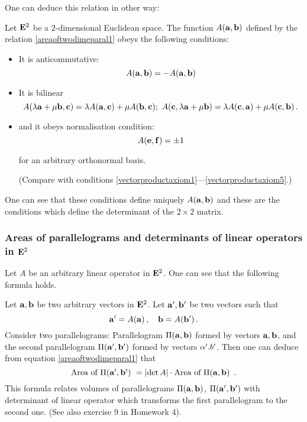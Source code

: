 \documentclass[12pt]{article}
\numberwithin{equation}{section}
\begin{document}
{\footnotesize One can deduce this relation in other way:

  Let ${\bf E}^2$ be a $2$-dimensional Euclidean space. The function $A({\bf a},{\bf b})$
  defined by the relation  \eqref{areaoftwodimeparal1} obeys the following conditions:

 \begin{itemize}

\item
   It is anticommutative:
 \begin{equation}\label{condit1}
   A({\bf a},{\bf b})=-A({\bf a},{\bf b})
\end{equation}

\item It is bilinear
  \begin{equation}\label{condit2}
A(\lambda{\bf a}+\mu {\bf b},{\bf c})=\lambda A({\bf a},{\bf c})+\mu A({\bf b},{\bf c}); \,\,
A({\bf c},\lambda{\bf a}+\mu {\bf b})=\lambda A({\bf c},{\bf a})+\mu A({\bf c},{\bf b})\,.
\end{equation}
\item and it obeys normalisation condition:
    \begin{equation}\label{condit3}
   A({\bf e},{\bf f})=\pm 1
\end{equation}

for an arbitrary orthonormal basis.



(Compare with conditions \eqref{vectorproductaxiom1}---\eqref{vectorproductaxiom5}.)

  \end{itemize}
One can see that these conditions define uniquely
$A({\bf a},{\bf b})$ and these are the conditions which define the determinant of the $2\times 2$ matrix.
}


\subsubsection {Areas  of parallelograms
and determinants of linear operators in ${\bf E}^2$}



  Let $A$ be an arbitrary linear operator in ${\bf E}^2$.
One can see that 
the following formula holds.

 Let ${\bf a},{\bf b}$ be two  arbitrary vectors in
  ${\bf E}^2$.  Let ${\bf a}',{\bf b}'$ be two vectors such that
                   \begin{equation*}
       {\bf a}'=A({\bf a})\,,\quad{\bf b}=A({\bf b}')\,.
                    \end{equation*}
Consider two parallelograms:
   Parallelogram $\Pi({\bf a},{\bf b})$ formed by vectors ${\bf a},{\bf b}$,
and the second parallelogram $\Pi({\bf a}',{\bf b}')$ 
formed by vectors $\alpha'.b'$.  Then one can deduce
from equation \eqref{areaoftwodimeparal1}
that 
                 \begin{equation}\label{before1}
         \hbox{Area of $\Pi({\bf a}',{\bf b}')$ }=
         \left|
                \det A\right|
           \cdot\hbox{Area of $\Pi({\bf a},{\bf b})$ }
                     \,.
                     \end{equation}
This formula relates volumes of parallelograms
  $\Pi({\bf a},{\bf b})$, $\Pi({\bf a}',{\bf b}')$ with determinant of linear operator
 which transforms the first parallelogram to the second one.
 (See also exercise 9 in Homework 4).
\end{document}
